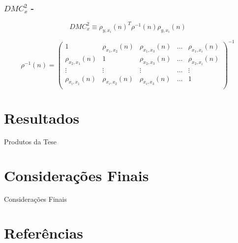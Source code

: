 \documentclass[10pt]{beamer}
\newcommand{\dmc}{\(DMC_x^2\) }
\begin{document}
\begin{frame}
  \frametitle{\dmc - \cite{Zebende2018}}
  \begin{equation}\label{eq:dmc}
  {DMC}_{x}^{2}  \equiv \rho_{y,x_{i}}(n)^{T} \rho^{-1}(n) \rho_{y,x_{i}}(n)
\end{equation}


\begin{equation}\label{eq:dmc_mat_inv}
  \rho^{-1}(n) = \left(\begin{matrix} 
    1 & \rho_{x_{1},x_{2}}(n)                       &  \rho_{x_{1},x_{3}}(n) & \dots  &  \rho_{x_{1},x_{i}}(n) \\
    \rho_{x_{2},x_{1}}(n) & 1                       &  \rho_{x_{2},x_{3}}(n) & \dots  &  \rho_{x_{2},x_{i}}(n) \\
    \vdots                &  \vdots                 &  \vdots                & \dots  & \vdots \\
    \rho_{x_{i},x_{1}}(n) & \rho_{x_{i},x_{2}}(n)   &  \rho_{x_{i},x_{3}}(n) & \dots  &  1 \\
    \end{matrix}\right)^{-1}
\end{equation}

  

\end{frame}


\section{Resultados}

\begin{frame}{Produtos da Tese}


  
\end{frame}


\begin{frame}
  \frametitle{}

  

\end{frame}

\section{Considerações Finais}

\begin{frame}{Considerações Finais}



\end{frame}


\section{Referências}

\begin{frame}[allowframebreaks]

  
  
\end{frame}
\end{document}
